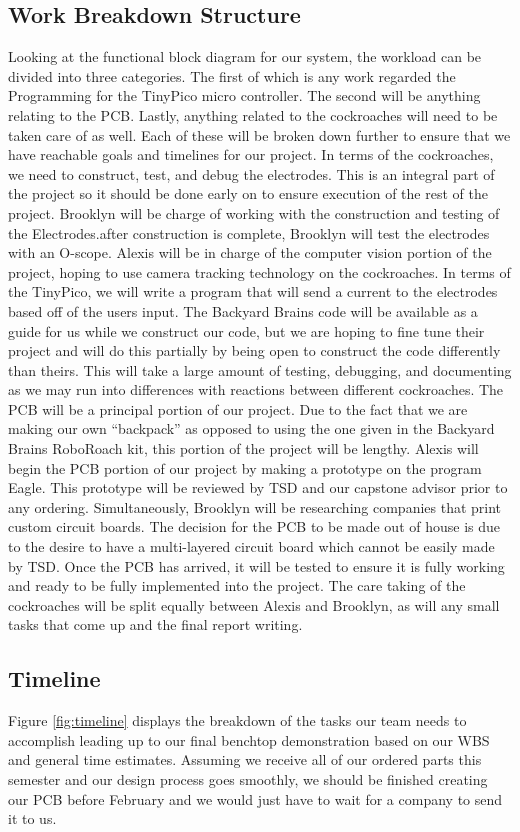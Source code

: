 \documentclass{article}
\begin{document}
\subsection{Work Breakdown Structure}
Looking at the functional block diagram for our system, the workload can be divided into three categories. The first of which is any work regarded the Programming for the TinyPico micro controller. The second will be anything relating to the PCB. Lastly, anything related to the cockroaches will need to be taken care of as well. Each of these will be broken down further to ensure that we have reachable goals and timelines for our project. In terms of the cockroaches, we need to construct, test, and debug the electrodes. This is an integral part of the project so it should be done early on to ensure execution of the rest of the project. Brooklyn will be charge of working with the construction and testing of the Electrodes.after construction is complete, Brooklyn will test the electrodes with an O-scope. Alexis will be in charge of the computer vision portion of the project, hoping to use camera tracking technology on the cockroaches. In terms of the TinyPico, we will write a program that will send a current to the electrodes based off of the users input. The Backyard Brains code will be available as a guide for us while we construct our code, but we are hoping to fine tune their project and will do this partially by being open to construct the code differently than theirs. This will take a large amount of testing, debugging, and documenting as we may run into differences with reactions between different cockroaches. The PCB will be a principal portion of our project. Due to the fact that we are making our own ``backpack'' as opposed to using the one given in the Backyard Brains RoboRoach kit, this portion of the project will be lengthy. Alexis will begin the PCB portion of our project by making a prototype on the program Eagle. This prototype will be reviewed by TSD and our capstone advisor prior to any ordering. Simultaneously, Brooklyn will be researching companies that print custom circuit boards. The decision for the PCB to be made out of house is due to the desire to have a multi-layered circuit board which cannot be easily made by TSD. Once the PCB has arrived, it will be tested to ensure it is fully working and ready to be fully implemented into the project. The care taking of the cockroaches will be split equally between Alexis and Brooklyn, as will any small tasks that come up and the final report writing.  

\subsection{Timeline}
 Figure \ref{fig:timeline} displays the breakdown of the tasks our team needs to accomplish leading up to our final benchtop demonstration based on our WBS and general time estimates. Assuming we receive all of our ordered parts this semester and our design process goes smoothly, we should be finished creating our PCB before February and we would just have to wait for a company to send it to us.
\end{document}

